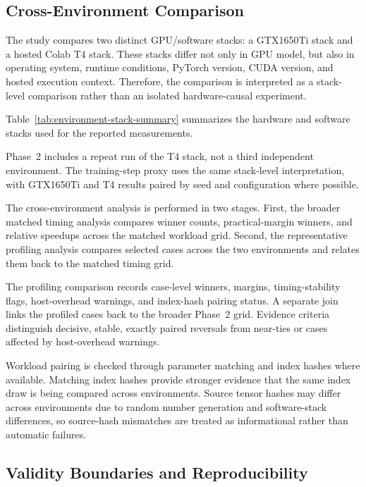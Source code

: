 \subsection{Cross-Environment Comparison}

The study compares two distinct GPU/software stacks: a GTX1650Ti stack and a hosted Colab T4 stack. These stacks differ not only in GPU model, but also in operating system, runtime conditions, PyTorch version, CUDA version, and hosted execution context. Therefore, the comparison is interpreted as a stack-level comparison rather than an isolated hardware-causal experiment.

Table~\ref{tab:environment-stack-summary} summarizes the hardware and software stacks used for the reported measurements.



Phase~2 includes a repeat run of the T4 stack, not a third independent environment. The training-step proxy uses the same stack-level interpretation, with GTX1650Ti and T4 results paired by seed and configuration where possible.

The cross-environment analysis is performed in two stages. First, the broader matched timing analysis compares winner counts, practical-margin winners, and relative speedups across the matched workload grid. Second, the representative profiling analysis compares selected cases across the two environments and relates them back to the matched timing grid.

The profiling comparison records case-level winners, margins, timing-stability flags, host-overhead warnings, and index-hash pairing status. A separate join links the profiled cases back to the broader Phase~2 grid. Evidence criteria distinguish decisive, stable, exactly paired reversals from near-ties or cases affected by host-overhead warnings.

Workload pairing is checked through parameter matching and index hashes where available. Matching index hashes provide stronger evidence that the same index draw is being compared across environments. Source tensor hashes may differ across environments due to random number generation and software-stack differences, so source-hash mismatches are treated as informational rather than automatic failures.

\subsection{Validity Boundaries and Reproducibility}

